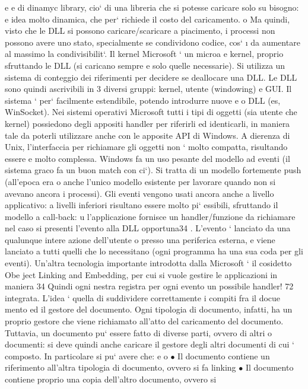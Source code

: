 \documentclass[a4paper,12pt]{article}
\begin{document}
e
e
di dinamyc library, cio` di una libreria che si potesse caricare solo su bisogno:
e
idea molto dinamica, che per` richiede il costo del caricamento.
o
Ma quindi, visto che le DLL si possono caricare/scaricare a piacimento, i
processi non possono avere uno stato, specialmente se condividono codice, cos`
\i{}
da aumentare al massimo la condivisibilit`. Il kernel Microsoft ` un microa
e
kernel, proprio sfruttando le DLL (si caricano sempre e solo quelle necessarie).
Si utilizza un sistema di conteggio dei riferimenti per decidere se deallocare una
DLL.
Le DLL sono quindi ascrivibili in 3 diversi gruppi: kernel, utente (windowing) e GUI. Il sistema ` per` facilmente
estendibile, potendo introdurre nuove
e
o
DLL (es, WinSocket).
Nei sistemi operativi Microsoft tutti i tipi di oggetti (sia utente che kernel)
possiedono degli appositi handler per riferirli ed identicarli, in maniera tale da
poterli utilizzare anche con le apposite API di Windows. A dierenza di Unix,
l'interfaccia per richiamare gli oggetti non ` molto compatta, risultando essere
e
molto complessa.
Windows fa un uso pesante del modello ad eventi (il sistema graco fa un
buon match con ci`). Si tratta di un modello fortemente push (all'epoca era
o
anche l'unico modello esistente per lavorare quando non si avevano ancora i
processi). Gli eventi vengono usati ancora anche a livello applicativo: a livelli
inferiori risultano essere molto pi` essibili, sfruttando il modello a call-back:
u
l'applicazione fornisce un handler/funzione da richiamare nel caso si presenti
l'evento alla DLL opportuna34 . L'evento ` lanciato da una qualunque intere
azione dell'utente o presso una periferica esterna, e viene lanciato a tutti quelli
che lo necessitano (ogni programma ha una sua coda per gli eventi).
Un'altra tecnologia importante introdotta dalla Microsoft ` il cosidetto Obe
ject Linking and Embedding, per cui si vuole gestire le applicazioni in maniera
34 Quindi
ogni nestra registra per ogni evento un possibile handler!
72
\newpage
integrata. L'idea ` quella di suddividere correttamente i compiti fra il docue
mento ed il gestore del documento. Ogni tipologia di documento, infatti, ha un
proprio gestore che viene richiamato all'atto del caricamento del documento.
Tuttavia, un documento pu` essere fatto di diverse parti, ovvero di altri
o
documenti: si deve quindi anche caricare il gestore degli altri documenti di cui
` composto. In particolare si pu` avere che:
e
o
$\bullet$ Il documento contiene un riferimento all'altra tipologia di documento,
ovvero si fa linking
$\bullet$ Il documento contiene proprio una copia dell'altro documento, ovvero si
\end{document}

